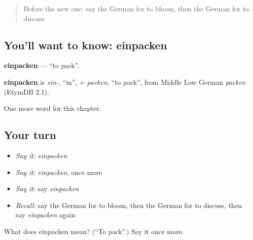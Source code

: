 \begin{quote}
Before the new one: say the German for to bloom, then the German for to discuss.
\end{quote}

\subsection*{You'll want to know: einpacken}
\textbf{einpacken} — \textquotedblleft{}to pack\textquotedblright{}.

\begin{cousinweb}
\textbf{einpacken} is \emph{ein-}, \textquotedblleft{}in\textquotedblright{}, + \emph{packen}, \textquotedblleft{}to pack\textquotedblright{}, from Middle Low German \emph{packen} (EtymDB 2.1).
\end{cousinweb}

\begin{grammarlens}[title={What you've built}]
One more word for this chapter.
\end{grammarlens}

\subsection*{Your turn}
\begin{itemize}
\raggedright
  \item \emph{Say it:} \emph{einpacken}
  \item \emph{Say it:} \emph{einpacken}, once more
  \item \emph{Say it:} say \emph{einpacken}
  \item \emph{Recall:} say the German for to bloom, then the German for to discuss, then say \emph{einpacken} again
\end{itemize}

\begin{tcolorbox}[breakable,colback=teal!4,colframe=teal!35!black,title={Before you move on}]
What does einpacken mean? (\textquotedblleft{}To pack\textquotedblright{}.) Say it once more.
\end{tcolorbox}
